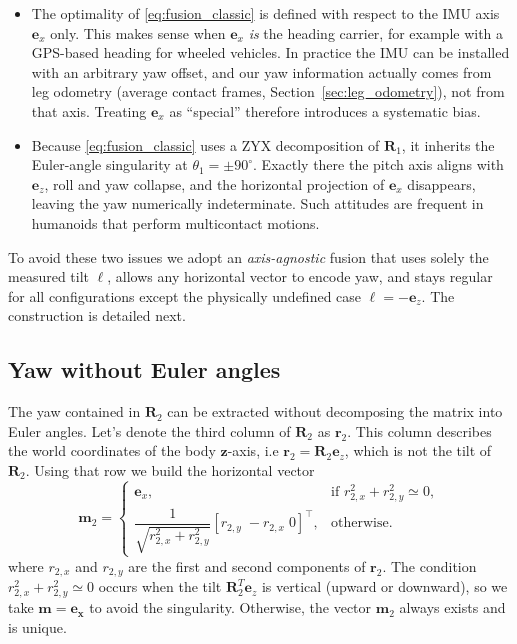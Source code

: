 \documentclass{IJCAS}
\begin{document}
\begin{itemize}
\item The optimality of \eqref{eq:fusion_classic} is defined with
      respect to the IMU axis $\boldsymbol{e}_{x}$ only.  
      This makes sense when $\boldsymbol{e}_{x}$ \emph{is} the heading
      carrier, for example with a GPS-based heading for wheeled vehicles.  
      In practice the IMU can be installed with an arbitrary yaw
      offset, and our yaw information actually comes from leg odometry
      (average contact frames, Section~\ref{sec:leg_odometry}), not from
      that axis.  Treating $\boldsymbol{e}_{x}$ as ``special'' therefore
      introduces a systematic bias.

\item Because \eqref{eq:fusion_classic} uses a ZYX decomposition of
      $\boldsymbol{R}_{1}$, it inherits the Euler-angle singularity at
      $\theta_{1}= \pm 90^{\circ}$.  
      Exactly there the pitch axis aligns with
      $\boldsymbol{e}_{z}$, roll and yaw collapse, and the horizontal
      projection of $\boldsymbol{e}_{x}$ disappears, leaving the yaw
      numerically indeterminate.  
      Such attitudes are frequent in humanoids that perform
      multicontact motions.
\end{itemize}
To avoid these two issues we adopt an \emph{axis-agnostic} fusion that
uses solely the measured tilt $\boldsymbol{\ell}$, allows any horizontal
vector to encode yaw, and stays regular for all configurations except
the physically undefined case $\boldsymbol{\ell}=-\boldsymbol{e}_{z}$.
The construction is detailed next.

\subsection{Yaw without Euler angles}
\label{sec:yaw_no_euler}

The yaw contained in $\boldsymbol{R}_{2}$ can be extracted without decomposing the
matrix into Euler angles.  Let's denote the third column of $\boldsymbol{R}_{2}$ as $\boldsymbol{r}_{2}$.
This column describes the world coordinates of the body $\boldsymbol{z}$-axis, i.e $\boldsymbol{r}_{2}=\boldsymbol{R}_{2}\boldsymbol{e}_z$, which is not the tilt of $\boldsymbol{R}_{2}$. 
Using that row we build the horizontal vector
\begin{equation}
  \boldsymbol{m}_2
  =
  \begin{cases}
    \boldsymbol{e}_x, &
    \text{if } {r}_{2,x}^{2}+{r}_{2,y}^{2}\simeq0,\\[6pt]
      \dfrac{1}{\sqrt{{r}_{2,x}^{2}+{r}_{2,y}^{2}}} [{r}_{2,y}\;-{r}_{2,x}\;0]^{\top},
    & \text{otherwise.}
  \end{cases}
\end{equation}
where ${r}_{2,x}$ and ${r}_{2,y}$ are the first and second components of $\boldsymbol{r}_{2}$. 
The condition ${r}_{2,x}^{2}+{r}_{2,y}^{2}\simeq0$ occurs when the tilt $\boldsymbol{R}_{2}^T \boldsymbol{e}_z$ is vertical (upward or downward), so we take $\boldsymbol{m}=\boldsymbol{e_x}$ to avoid the singularity.
Otherwise, the vector $\boldsymbol{m}_2$ always exists and is unique.
\end{document}
